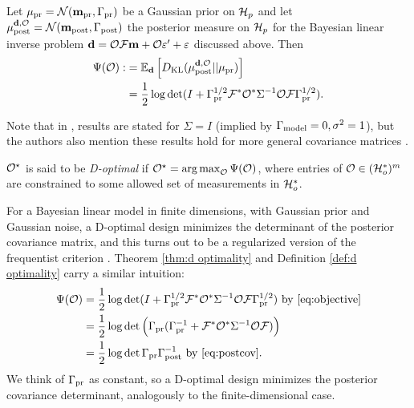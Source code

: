 \begin{theorem}\label{thm:d optimality}
  Let $\mu_{\textup{pr}} = \mathcal{N}(\mathbf{m}_{\textup{pr}},\Gamma_{\textup{pr}})$ be a Gaussian prior on $\mathcal{H}_p$
  and let $\mu_{\textup{post}}^{\mathbf{d}, \mathcal{O}} = \mathcal{N}(\mathbf{m}_{\textup{post}},\Gamma_{\textup{post}})$ the posterior measure
  on $\mathcal{H}_p$ for the Bayesian linear inverse problem $\mathbf{d} = \mathcal{O}
  \mathcal{F}\mathbf{m} + \mathcal{O} \varepsilon' + \varepsilon$ discussed above. Then
  \begin{align}\label{eq:objective}
    \begin{split}
      \Psi( \mathcal{O}) :&= \mathbb{E}_{\mathbf{d}}\left [ D_{\text{KL}} (\mu_{\textup{post}}^{\mathbf{d}, \mathcal{O}} || \mu_{\textup{pr}} ) \right ] \\
      &= \frac12 \log \det 
      ( I + \Gamma_{\textup{pr}}^{1/2}  \mathcal{F} ^* \mathcal{O}^* \Sigma^{-1} \mathcal{O} \mathcal{F} \Gamma_{\textup{pr}}^{1/2}).
    \end{split}
  \end{align}
\end{theorem}

Note that in \cite{AlexanderianGloorGhattas14,
  alexanderian2018efficient}, results are stated for $\Sigma=I$
(implied by $\Gamma_{\textup{model}} = 0,\sigma^2=1$), but the authors also mention
these results hold for more general covariance matrices
\cite[p. 681]{AlexanderianGloorGhattas14}.

\begin{definition}\label{def:d optimality}
  $\mathcal{O}^{\star}$ is said to be \emph{D-optimal} if $\mathcal{O}^{\star} =
  \operatorname*{arg\,max}_{\mathcal{O}} \Psi(\mathcal{O})$, where entries of $\mathcal{O} \in (\mathcal{H}_o^*)^m$
  are constrained to some allowed set of measurements in $\mathcal{H}_o^*$.
\end{definition}

For a Bayesian linear model in finite dimensions, with Gaussian prior
and Gaussian noise, a D-optimal design minimizes the determinant of
the posterior covariance matrix, and this turns out to be a
regularized version of the frequentist criterion
\cite{Chaloner1995}. Theorem \ref{thm:d optimality} and Definition
\ref{def:d optimality} carry a similar intuition:
\begin{align*}
  \begin{split}
    \Psi(\mathcal{O}) &= \frac12 \log \det ( I + \Gamma_{\textup{pr}}^{1/2}  \mathcal{F} ^* \mathcal{O}^* \Sigma^{-1} \mathcal{O} \mathcal{F} \Gamma_{\textup{pr}}^{1/2}) \text{ by \eqref{eq:objective}}\\
    &= \frac12 \log \det \Big( \Gamma_{\textup{pr}} ( \Gamma_{\textup{pr}}^{-1} + \mathcal{F} ^* \mathcal{O}^* \Sigma^{-1} \mathcal{O} \mathcal{F}) \Big )\\
    &= \frac12 \log \det \Gamma_{\textup{pr}} \Gamma_{\textup{post}}^{-1} \text{ by \eqref{eq:postcov}}.
  \end{split}
\end{align*}
We think of $\Gamma_{\textup{pr}}$ as constant, so a D-optimal design minimizes the
posterior covariance determinant, analogously to the
finite-dimensional case.



